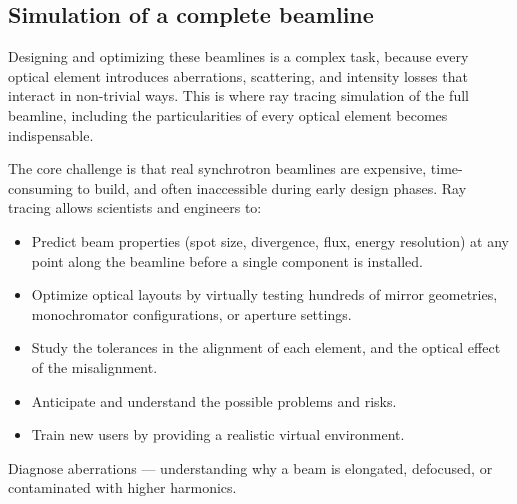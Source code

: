 \subsection{Simulation of a complete beamline}

Designing and optimizing these beamlines is a complex task, because every optical element introduces aberrations, scattering, and intensity losses that interact in non-trivial ways. This is where ray tracing simulation of the full beamline, including the particularities of every optical element becomes indispensable.

The core challenge is that real synchrotron beamlines are expensive, time-consuming to build, and often inaccessible during early design phases. Ray tracing allows scientists and engineers to:

\begin{itemize}
    \item Predict beam properties (spot size, divergence, flux, energy resolution) at any point along the beamline before a single component is installed.
    \item Optimize optical layouts by virtually testing hundreds of mirror geometries, monochromator configurations, or aperture settings.
    \item Study the tolerances in the alignment of each element, and the optical effect of the misalignment. 
    \item Anticipate and understand the possible problems and risks.
    \item Train new users by providing a realistic virtual environment.
\end{itemize}


Diagnose aberrations — understanding why a beam is elongated, defocused, or contaminated with higher harmonics.
